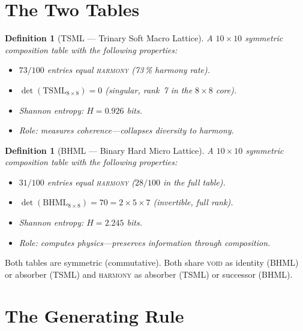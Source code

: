 \documentclass[12pt, openany]{book}
\newtheorem{definition}[theorem]{Definition}
\theoremstyle{remark}
\begin{document}
\section{The Two Tables}
\label{sec:two-tables}

\begin{definition}[TSML --- Trinary Soft Macro Lattice]
\label{def:tsml}
A $10\times 10$ symmetric composition table with the following properties:
\begin{itemize}
  \item $73/100$ entries equal \textsc{harmony} (73\,\% harmony rate).
  \item $\det(\mathrm{TSML}_{8\times 8}) = 0$ (singular, rank~7 in the
        $8\times 8$ core).
  \item Shannon entropy: $H = 0.926$ bits.
  \item Role: \emph{measures} coherence---collapses diversity to harmony.
\end{itemize}
\end{definition}

\begin{definition}[BHML --- Binary Hard Micro Lattice]
\label{def:bhml}
A $10\times 10$ symmetric composition table with the following properties:
\begin{itemize}
  \item $31/100$ entries equal \textsc{harmony} ($28/100$ in the full table).
  \item $\det(\mathrm{BHML}_{8\times 8}) = 70 = 2\times 5\times 7$ (invertible,
        full rank).
  \item Shannon entropy: $H = 2.245$ bits.
  \item Role: \emph{computes} physics---preserves information through composition.
\end{itemize}
\end{definition}

Both tables are symmetric (commutative).  Both share \textsc{void} as identity
(BHML) or absorber (TSML) and \textsc{harmony} as absorber (TSML) or successor
(BHML).

\section{The Generating Rule}
\label{sec:generating-rule}
\end{document}
